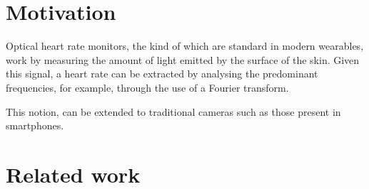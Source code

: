 \section{Motivation}
Optical heart rate monitors, the kind of which are standard in modern wearables,
work by measuring the amount of light emitted by the surface of the skin.
Given this signal, a heart rate can be extracted by analysing the predominant frequencies, for example, through the use
of a Fourier transform.

\par
This notion, can be extended to traditional cameras such as those present in smartphones.

\section{Related work}